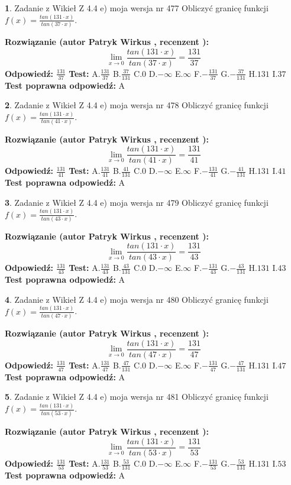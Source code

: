 \documentclass[12pt, a4paper]{article}
\theoremstyle{definition} %
\newtheorem{zad}{}
\newcommand{\zadStart}[1]{\begin{zad}#1\newline}
\newcommand{\zadStop}{\end{zad}}
\newcommand{\rozwStart}[2]{\noindent \textbf{Rozwiązanie (autor #1 , recenzent #2): }\newline}
\newcommand{\rozwStop}{\newline}
\newcommand{\odpStart}{\noindent \textbf{Odpowiedź:}\newline}
\newcommand{\odpStop}{\newline}
\newcommand{\testStart}{\noindent \textbf{Test:}\newline}
\newcommand{\testStop}{\newline}
\newcommand{\kluczStart}{\noindent \textbf{Test poprawna odpowiedź:}\newline}
\newcommand{\kluczStop}{\newline}
\begin{document}
\zadStart{Zadanie z Wikieł Z 4.4 e) moja wersja nr 477}
Obliczyć granicę funkcji $f(x)=\frac{tan(131\cdot x)}{tan(37\cdot x)}$.
\zadStop
\rozwStart{Patryk Wirkus}{}
$$\lim\limits_{x\to 0}\frac{tan(131\cdot x)}{tan(37\cdot x)}=
\frac{131}{37}$$
\rozwStop
\odpStart
$\frac{131}{37}$
\odpStop
\testStart
A.$\frac{131}{37}$
B.$\frac{37}{131}$
C.$0$
D.$-\infty$
E.$\infty$
F.$-\frac{131}{37}$
G.$-\frac{37}{131}$
H.$131$
I.$37$
\testStop
\kluczStart
A
\kluczStop



\zadStart{Zadanie z Wikieł Z 4.4 e) moja wersja nr 478}
Obliczyć granicę funkcji $f(x)=\frac{tan(131\cdot x)}{tan(41\cdot x)}$.
\zadStop
\rozwStart{Patryk Wirkus}{}
$$\lim\limits_{x\to 0}\frac{tan(131\cdot x)}{tan(41\cdot x)}=
\frac{131}{41}$$
\rozwStop
\odpStart
$\frac{131}{41}$
\odpStop
\testStart
A.$\frac{131}{41}$
B.$\frac{41}{131}$
C.$0$
D.$-\infty$
E.$\infty$
F.$-\frac{131}{41}$
G.$-\frac{41}{131}$
H.$131$
I.$41$
\testStop
\kluczStart
A
\kluczStop



\zadStart{Zadanie z Wikieł Z 4.4 e) moja wersja nr 479}
Obliczyć granicę funkcji $f(x)=\frac{tan(131\cdot x)}{tan(43\cdot x)}$.
\zadStop
\rozwStart{Patryk Wirkus}{}
$$\lim\limits_{x\to 0}\frac{tan(131\cdot x)}{tan(43\cdot x)}=
\frac{131}{43}$$
\rozwStop
\odpStart
$\frac{131}{43}$
\odpStop
\testStart
A.$\frac{131}{43}$
B.$\frac{43}{131}$
C.$0$
D.$-\infty$
E.$\infty$
F.$-\frac{131}{43}$
G.$-\frac{43}{131}$
H.$131$
I.$43$
\testStop
\kluczStart
A
\kluczStop



\zadStart{Zadanie z Wikieł Z 4.4 e) moja wersja nr 480}
Obliczyć granicę funkcji $f(x)=\frac{tan(131\cdot x)}{tan(47\cdot x)}$.
\zadStop
\rozwStart{Patryk Wirkus}{}
$$\lim\limits_{x\to 0}\frac{tan(131\cdot x)}{tan(47\cdot x)}=
\frac{131}{47}$$
\rozwStop
\odpStart
$\frac{131}{47}$
\odpStop
\testStart
A.$\frac{131}{47}$
B.$\frac{47}{131}$
C.$0$
D.$-\infty$
E.$\infty$
F.$-\frac{131}{47}$
G.$-\frac{47}{131}$
H.$131$
I.$47$
\testStop
\kluczStart
A
\kluczStop



\zadStart{Zadanie z Wikieł Z 4.4 e) moja wersja nr 481}
Obliczyć granicę funkcji $f(x)=\frac{tan(131\cdot x)}{tan(53\cdot x)}$.
\zadStop
\rozwStart{Patryk Wirkus}{}
$$\lim\limits_{x\to 0}\frac{tan(131\cdot x)}{tan(53\cdot x)}=
\frac{131}{53}$$
\rozwStop
\odpStart
$\frac{131}{53}$
\odpStop
\testStart
A.$\frac{131}{53}$
B.$\frac{53}{131}$
C.$0$
D.$-\infty$
E.$\infty$
F.$-\frac{131}{53}$
G.$-\frac{53}{131}$
H.$131$
I.$53$
\testStop
\kluczStart
A
\kluczStop
\end{document}
